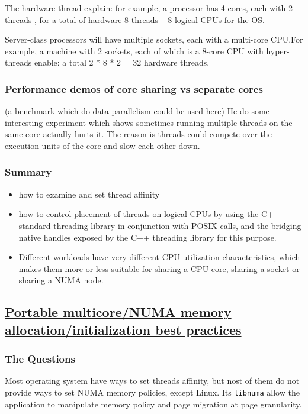 \documentclass[11pt]{article}
\begin{document}
The hardware thread explain: for example, a processor has 4 cores, each with 2 threads , for a total of hardware 8-threads -- 8 logical CPUs for the OS.

Server-class processors will have multiple sockets, each with a multi-core CPU.For example, a machine with 2 sockets, each of which is a 8-core CPU with hyper-threads enable: a total 2 * 8 * 2 = 32 hardware threads.


\subsubsection{Performance demos of core sharing vs separate cores}
\label{sec-7-1-7}
(a benchmark which do data parallelism could be used \href{https://github.com/eliben/code-for-blog/tree/master/2016/threads-affinity}{here})
He do some interesting experiment which shows sometimes running multiple threads on the same core actually hurts it. The reason is threads could compete over the execution units of the core and slow each other down.

\subsubsection{Summary}
\label{sec-7-1-8}
\begin{itemize}
\item how to examine and set thread affinity
\item how to control placement of threads on logical CPUs by using the C++ standard threading library in conjunction with POSIX calls, and the bridging native handles exposed by the C++ threading library for this purpose.
\item Different workloads have very different CPU utilization characteristics, which makes them more or less suitable for sharing a CPU core, sharing a socket or sharing a NUMA node.
\end{itemize}


\subsection{\href{https://scicomp.stackexchange.com/questions/2028/portable-multicore-numa-memory-allocation-initialization-best-practices}{Portable multicore/NUMA memory allocation/initialization best practices}}
\label{sec-7-2}
\subsubsection{The Questions}
\label{sec-7-2-1}
Most operating system have ways to set threads affinity, but nost of them do not provide ways to set NUMA memory policies, except Linux. Its \verb~libnuma~ allow the application to manipulate memory policy and page migration at page granularity.
\end{document}
